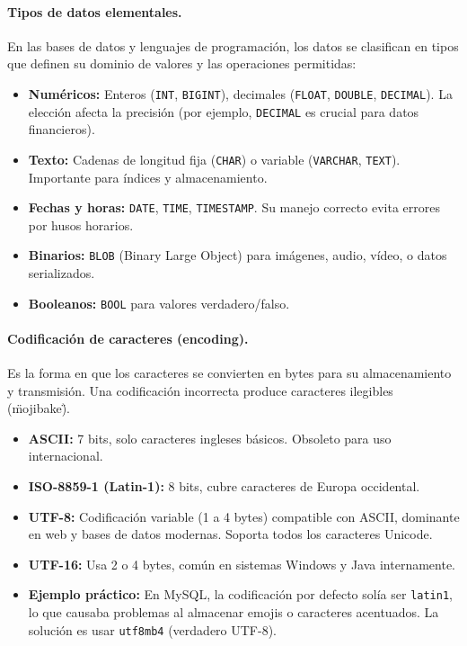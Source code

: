 \documentclass[12pt,a4paper,openany,oneside]{book}
\begin{document}
\paragraph{Tipos de datos elementales.}
En las bases de datos y lenguajes de programación, los datos se clasifican en tipos que definen su dominio de valores y las operaciones permitidas:
\begin{itemize}
    \item \textbf{Numéricos:} Enteros (\texttt{INT}, \texttt{BIGINT}), decimales (\texttt{FLOAT}, \texttt{DOUBLE}, \texttt{DECIMAL}). La elección afecta la precisión (por ejemplo, \texttt{DECIMAL} es crucial para datos financieros).
    \item \textbf{Texto:} Cadenas de longitud fija (\texttt{CHAR}) o variable (\texttt{VARCHAR}, \texttt{TEXT}). Importante para índices y almacenamiento.
    \item \textbf{Fechas y horas:} \texttt{DATE}, \texttt{TIME}, \texttt{TIMESTAMP}. Su manejo correcto evita errores por husos horarios.
    \item \textbf{Binarios:} \texttt{BLOB} (Binary Large Object) para imágenes, audio, vídeo, o datos serializados.
    \item \textbf{Booleanos:} \texttt{BOOL} para valores verdadero/falso.
\end{itemize}

\paragraph{Codificación de caracteres (encoding).}
Es la forma en que los caracteres se convierten en bytes para su almacenamiento y transmisión. Una codificación incorrecta produce caracteres ilegibles (\"mojibake\").
\begin{itemize}
    \item \textbf{ASCII:} 7 bits, solo caracteres ingleses básicos. Obsoleto para uso internacional.
    \item \textbf{ISO-8859-1 (Latin-1):} 8 bits, cubre caracteres de Europa occidental.
    \item \textbf{UTF-8:} Codificación variable (1 a 4 bytes) compatible con ASCII, dominante en web y bases de datos modernas. Soporta todos los caracteres Unicode.
    \item \textbf{UTF-16:} Usa 2 o 4 bytes, común en sistemas Windows y Java internamente.
    \item \textbf{Ejemplo práctico:} En MySQL, la codificación por defecto solía ser \texttt{latin1}, lo que causaba problemas al almacenar emojis o caracteres acentuados. La solución es usar \texttt{utf8mb4} (verdadero UTF-8).
\end{itemize}
\end{document}
